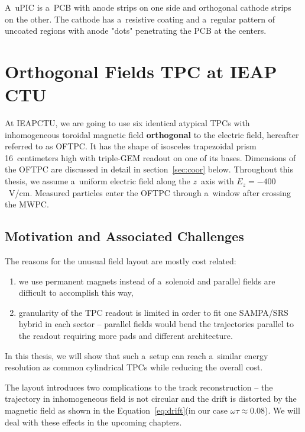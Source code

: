 				A~\ac{uPIC} is a~\ac{PCB} with anode strips on one side and orthogonal cathode strips on the other. The cathode has a~resistive coating and a~regular pattern of uncoated regions with anode "dots" penetrating the \ac{PCB} at the centers.
	
	\section{Orthogonal Fields TPC at IEAP CTU}
	\label{sec:oftpc}
		At \ac{IEAPCTU}, we are going to use six identical atypical \acp{TPC} with inhomogeneous toroidal magnetic field \textbf{orthogonal} to the electric field, hereafter referred to as \acf{OFTPC}. It has the shape of isosceles trapezoidal prism 16~centimeters high with triple\nobreakdash-\ac{GEM} readout on one of its bases. Dimensions of the \ac{OFTPC} are discussed in detail in section~\ref{sec:coor} below. Throughout this thesis, we assume a~uniform electric field along the $z$~axis with $E_z = -400$~V/cm. Measured particles enter the \ac{OFTPC} through a~window after crossing the \ac{MWPC}.
		
		
		\subsection{Motivation and Associated Challenges}
			The reasons for the unusual field layout are mostly cost related:
				\begin{enumerate}[nosep,label=\alph*)]
					\item we use permanent magnets instead of a~solenoid and parallel fields are difficult to accomplish this way,
					\item granularity of the \ac{TPC} readout is limited in order to fit one SAMPA/SRS hybrid in each sector -- parallel fields would bend the trajectories parallel to the readout requiring more pads and different architecture.
				\end{enumerate}
			In this thesis, we will show that such a~setup can reach a~similar energy resolution as common cylindrical \acp{TPC} while reducing the overall cost.
			
			The layout introduces two complications to the track reconstruction -- the trajectory in inhomogeneous field is not circular and the drift is distorted by the magnetic field as shown in the Equation~\ref{eq:drift}(in our case $\omega\tau \approx 0.08$). We will deal with these effects in the upcoming chapters.
			
